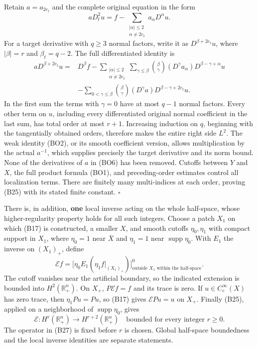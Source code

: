 \documentclass[
  11pt,
]{article}
\begin{document}
Retain \(a=a_{2e_t}\) and the complete original equation in the form \[
 aD_t^2u=f-\sum_{\substack{|\alpha|\leq2\\\alpha\ne2e_t}}
                         a_\alpha D^\alpha u.
 \tag{B26}
\] For a target derivative with \(q\geq3\) normal factors, write it as
\(D^{\beta+2e_t}u\), where \(|\beta|=r\) and \(\beta_t=q-2\). The full
differentiated identity is \[
 \begin{split}
 aD^{\beta+2e_t}u
 ={}&D^\beta f
 -\sum_{\substack{|\alpha|\leq2\\\alpha\ne2e_t}}
      \sum_{\gamma\leq\beta}
       \binom\beta\gamma(D^\gamma a_\alpha)
                           D^{\beta-\gamma+\alpha}u\\
 &-\sum_{0<\gamma\leq\beta}
       \binom\beta\gamma(D^\gamma a)
                           D^{\beta-\gamma+2e_t}u.
 \end{split}
 \tag{BO6}
\] In the first sum the terms with \(\gamma=0\) have at most \(q-1\)
normal factors. Every other term on \(u\), including every
differentiated original normal coefficient in the last sum, has total
order at most \(r+1\). Increasing induction on \(q\), beginning with the
tangentially obtained orders, therefore makes the entire right side
\(L^2\). The weak identity (BO2), or its smooth coefficient version,
allows multiplication by the actual \(a^{-1}\), which supplies precisely
the target derivative and its norm bound. None of the derivatives of
\(a\) in (BO6) has been removed. Cutoffs between \(Y\) and \(X\), the
full product formula (BO1), and preceding-order estimates control all
localization terms. There are finitely many multi-indices at each order,
proving (B25) with its stated finite constant. \(\square\)

There is, in addition, \textbf{one} local inverse acting on the whole
half-space, whose higher-regularity property holds for all such
integers. Choose a patch \(X_1\) on which (B17) is constructed, a
smaller \(X\), and smooth cutoffs \(\eta_0,\eta_1\) with compact support
in \(X_1\), where \(\eta_0=1\) near \(\overline X\) and \(\eta_1=1\)
near \(\operatorname{supp}\eta_0\). With \(E_1\) the inverse on
\((X_1)_+\), define \[
 \mathcal E f=\bigl[\eta_0 E_1(\eta_1f|_{(X_1)_+})\bigr]^0_{
 \text{outside }X_1\text{ within the half-space}}. \tag{B27}
\] The cutoff vanishes near the artificial boundary, so the indicated
extension is bounded into \(H^2(\mathbb R^n_+)\). On \(X_+\),
\(P\mathcal Ef=f\) and its trace is zero. If \(u\in C_c^\infty(X)\) has
zero trace, then \(\eta_1Pu=Pu\), so (B17) gives \(\mathcal EPu=u\) on
\(X_+\). Finally (B25), applied on a neighborhood of
\(\operatorname{supp}\eta_0\), gives \[
 \mathcal E:H^r(\mathbb R^n_+)\longrightarrow H^{r+2}(\mathbb R^n_+)
 \quad\text{bounded for every integer }r\geq0. \tag{B28}
\] The operator in (B27) is fixed before \(r\) is chosen. Global
half-space boundedness and the local inverse identities are separate
statements.
\end{document}

